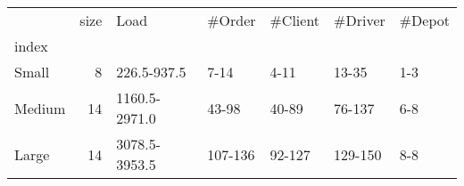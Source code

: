 \begin{tabular}{lrlllll}
\toprule
{} &  size &           Load &   \#Order & \#Client &  \#Driver & \#Depot \\
index  &       &                &          &         &          &        \\
\midrule
Small  &     8 &    226.5-937.5 &     7-14 &    4-11 &    13-35 &    1-3 \\
Medium &    14 &  1160.5-2971.0 &    43-98 &   40-89 &   76-137 &    6-8 \\
Large  &    14 &  3078.5-3953.5 &  107-136 &  92-127 &  129-150 &    8-8 \\
\bottomrule
\end{tabular}
